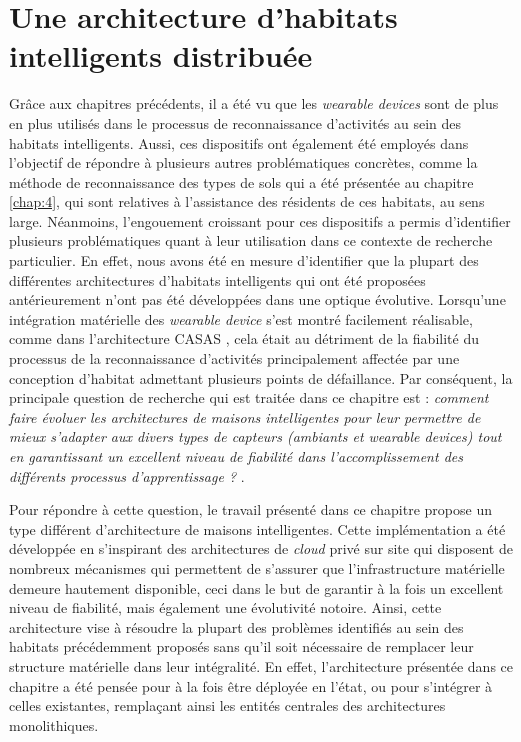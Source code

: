 \chapter{Une architecture d'habitats intelligents distribuée}
\label{chap:5}

Grâce aux chapitres précédents, il a été vu que les \textit{wearable devices} sont de plus en plus utilisés dans le processus de reconnaissance d'activités au sein des habitats intelligents. Aussi, ces dispositifs ont également été employés dans l'objectif de répondre à plusieurs autres problématiques concrètes, comme la méthode de reconnaissance des types de sols qui a été présentée au chapitre \ref{chap:4}, qui sont relatives à l'assistance des résidents de ces habitats, au sens large. Néanmoins, l'engouement croissant pour ces dispositifs a permis d'identifier plusieurs problématiques quant à leur utilisation dans ce contexte de recherche particulier. En effet, nous avons été en mesure d'identifier que la plupart des différentes architectures d'habitats intelligents qui ont été proposées antérieurement n'ont pas été développées dans une optique évolutive. Lorsqu'une intégration matérielle des \textit{wearable device} s'est montré facilement réalisable, comme dans l'architecture CASAS \citep{Cook2013}, cela était au détriment de la fiabilité du processus de la reconnaissance d'activités principalement affectée par une conception d'habitat admettant plusieurs points de défaillance. Par conséquent, la principale question de recherche qui est traitée dans ce chapitre est : \textit{\og comment faire évoluer les architectures de maisons intelligentes pour leur permettre de mieux s'adapter aux divers types de capteurs (ambiants et \textit{wearable devices}) tout en garantissant un excellent niveau de fiabilité dans l'accomplissement des différents processus d'apprentissage ? \fg}.

Pour répondre à cette question, le travail présenté dans ce chapitre propose un type différent d'architecture de maisons intelligentes. Cette implémentation a été développée en s'inspirant des architectures de \textit{cloud} privé sur site qui disposent de nombreux mécanismes qui permettent de s'assurer que l'infrastructure matérielle demeure hautement disponible, ceci dans le but de garantir à la fois un excellent niveau de fiabilité, mais également une évolutivité notoire. Ainsi, cette architecture vise à résoudre la plupart des problèmes identifiés au sein des habitats précédemment proposés sans qu'il soit nécessaire de remplacer leur structure matérielle dans leur intégralité. En effet, l'architecture présentée dans ce chapitre a été pensée pour à la fois être déployée en l'état, ou pour s'intégrer à celles existantes, remplaçant ainsi les entités centrales des architectures monolithiques.

